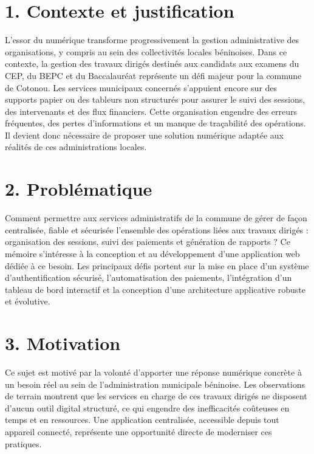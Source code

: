 \introduction

\section*{1. Contexte et justification}
L'essor du numérique transforme progressivement la gestion administrative des organisations, y compris au sein des collectivités locales béninoises. Dans ce contexte, la gestion des travaux dirigés destinés aux candidats aux examens du CEP, du BEPC et du Baccalauréat représente un défi majeur pour la commune de Cotonou. Les services municipaux concernés s'appuient encore sur des supports papier ou des tableurs non structurés pour assurer le suivi des sessions, des intervenants et des flux financiers. Cette organisation engendre des erreurs fréquentes, des pertes d'informations et un manque de traçabilité des opérations. Il devient donc nécessaire de proposer une solution numérique adaptée aux réalités de ces administrations locales.

\section*{2. Problématique}
Comment permettre aux services administratifs de la commune de gérer de façon centralisée, fiable et sécurisée l'ensemble des opérations liées aux travaux dirigés : organisation des sessions, suivi des paiements et génération de rapports ? Ce mémoire s'intéresse à la conception et au développement d'une application web dédiée à ce besoin. Les principaux défis portent sur la mise en place d'un système d'authentification sécurisé, l'automatisation des paiements, l'intégration d'un tableau de bord interactif et la conception d'une architecture applicative robuste et évolutive.

\section*{3. Motivation}
Ce sujet est motivé par la volonté d'apporter une réponse numérique concrète à un besoin réel au sein de l'administration municipale béninoise. Les observations de terrain montrent que les services en charge de ces travaux dirigés ne disposent d'aucun outil digital structuré, ce qui engendre des inefficacités coûteuses en temps et en ressources. Une application centralisée, accessible depuis tout appareil connecté, représente une opportunité directe de moderniser ces pratiques.

